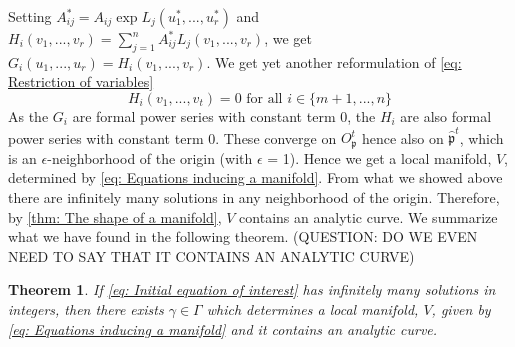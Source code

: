 \documentclass{article}
\newtheorem{theorem}{Theorem}[section]
\newcommand{\mfrak}[1]{\mathfrak{#1}}
\begin{document}
Setting $A_{ij}^* = A_{ij} \exp L_j(u_1^*, ..., u_r^*)$ and $H_i(v_1, ..., v_r) = \sum_{j = 1}^n A_{ij}^* L_j(v_1, ..., v_r)$, we get
$G_i(u_1, ..., u_r) = H_i(v_1, ..., v_r)$. We get yet another reformulation of \cref{eq: Restriction of variables}
\begin{equation}\label{eq: Equations inducing a manifold}
    H_i(v_1, ..., v_t) = 0 \text{ for all } i \in \{m+1, ..., n\}   
\end{equation}
As the $G_i$ are formal power series with constant term 0, the $H_i$ are also formal power series with constant term 0. These converge on $O_\mfrak p^t$ hence also on $\hat {\mfrak p}^t$, which is an $\epsilon$-neighborhood of the origin (with $\epsilon$ = 1). Hence we get a local manifold, $V$, determined by \cref{eq: Equations inducing a manifold}. From what we showed above there are infinitely many solutions in any neighborhood of the origin. Therefore, by \cref{thm: The shape of a manifold}, $V$ contains an analytic curve. We summarize what we have found in the following theorem. (QUESTION: DO WE EVEN NEED TO SAY THAT IT CONTAINS AN ANALYTIC CURVE)

\begin{theorem}\label{thm: Skolems method}
    If \cref{eq: Initial equation of interest} has infinitely many solutions in integers, then there exists $\gamma \in \Gamma$ which determines a local manifold, $V$, given by \cref{eq: Equations inducing a manifold} and it contains an analytic curve. 
\end{theorem}
\end{document}
